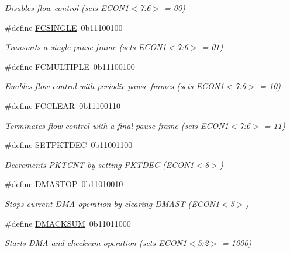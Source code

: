 \begin{DoxyCompactItemize}
\begin{DoxyCompactList}\small\item\em Disables flow control (sets E\+C\+O\+N1$<$7\+:6$>$ = 00) \end{DoxyCompactList}\item 
\#define \mbox{\hyperlink{group__single__byte_ga2d69e97099b83953d2e87b73f1b892cd}{F\+C\+S\+I\+N\+G\+LE}}~0b11100100
\begin{DoxyCompactList}\small\item\em Transmits a single pause frame (sets E\+C\+O\+N1$<$7\+:6$>$ = 01) \end{DoxyCompactList}\item 
\#define \mbox{\hyperlink{group__single__byte_gac545b2d639c3967af4c1150334952fb4}{F\+C\+M\+U\+L\+T\+I\+P\+LE}}~0b11100100
\begin{DoxyCompactList}\small\item\em Enables flow control with periodic pause frames (sets E\+C\+O\+N1$<$7\+:6$>$ = 10) \end{DoxyCompactList}\item 
\#define \mbox{\hyperlink{group__single__byte_ga9d7f9a8ede2963dbd00699d9244fd18a}{F\+C\+C\+L\+E\+AR}}~0b11100110
\begin{DoxyCompactList}\small\item\em Terminates flow control with a final pause frame (sets E\+C\+O\+N1$<$7\+:6$>$ = 11) \end{DoxyCompactList}\item 
\#define \mbox{\hyperlink{group__single__byte_gab4cdb8940073f2025cab184a4215510f}{S\+E\+T\+P\+K\+T\+D\+EC}}~0b11001100
\begin{DoxyCompactList}\small\item\em Decrements P\+K\+T\+C\+NT by setting P\+K\+T\+D\+EC (E\+C\+O\+N1$<$8$>$) \end{DoxyCompactList}\item 
\#define \mbox{\hyperlink{group__single__byte_ga6cda58c4a10d34c851230fc3ea7eaf1a}{D\+M\+A\+S\+T\+OP}}~0b11010010
\begin{DoxyCompactList}\small\item\em Stops current D\+MA operation by clearing D\+M\+A\+ST (E\+C\+O\+N1$<$5$>$) \end{DoxyCompactList}\item 
\#define \mbox{\hyperlink{group__single__byte_ga129e533bb06e3aa1641c9172edb56494}{D\+M\+A\+C\+K\+S\+UM}}~0b11011000
\begin{DoxyCompactList}\small\item\em Starts D\+MA and checksum operation (sets E\+C\+O\+N1$<$5\+:2$>$ = 1000) \end{DoxyCompactList}\item 

\end{DoxyCompactItemize}
